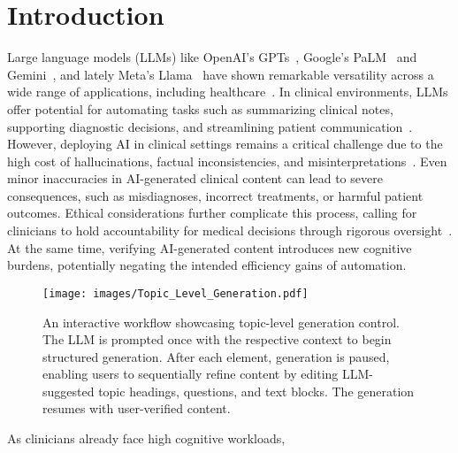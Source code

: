 \section{Introduction}
Large language models (LLMs) like OpenAI's GPTs~\citep{openai2024gpt4technicalreport, brown2020languagemodelsfewshotlearners}, Google's PaLM~\citep{anil2023palm2technicalreport} and Gemini~\citep{geminiteam2024geminifamilyhighlycapable}, and lately Meta's Llama~\citep{touvron2023llamaopenefficientfoundation,touvron2023llama2openfoundation,dubey2024llama3herdmodels} have shown remarkable versatility across a wide range of applications, including healthcare~\citep{singhal2023expertlevelmedicalquestionanswering,Huang2024PatientRepresentingPP}. In clinical environments, LLMs offer potential for automating tasks such as summarizing clinical notes, supporting diagnostic decisions, and streamlining patient communication~\citep{ijerph20043378,soleimani2024practical,ruinelli-etal-2024-experiments,Liu2023UtilityOC, Patel2023ChatGPTTF, van2024adapted, Zaretsky2024GenerativeAI,Were2010CreationAE}. However, deploying AI in clinical settings remains a critical challenge due to the high cost of hallucinations, factual inconsistencies, and misinterpretations~\citep{10.1145/3571730, Lin2024TowardsTL,tang2023evaluating, dada2024clue}. Even minor inaccuracies in AI-generated clinical content can lead to severe consequences, such as misdiagnoses, incorrect treatments, or harmful patient outcomes. Ethical considerations further complicate this process, calling for clinicians to hold accountability for medical decisions through rigorous oversight~\citep{Mesk2023TheIF,PMID:38285984}. At the same time, verifying AI-generated content introduces new cognitive burdens, potentially negating the intended efficiency gains of automation.
\begin{figure}[t!]
    \centering
   \texttt{[image: images/Topic\_Level\_Generation.pdf]}
  \caption{An interactive workflow showcasing topic-level generation control. The LLM is prompted once with the respective context to begin structured generation. After each element, generation is paused, enabling users to sequentially refine content by editing LLM-suggested topic headings, questions, and text blocks. The generation resumes with user-verified content.\vspace{-0.15cm}}
  \label{fig:interactive_generation_workflow}
\end{figure}
As clinicians already face high cognitive workloads, 
